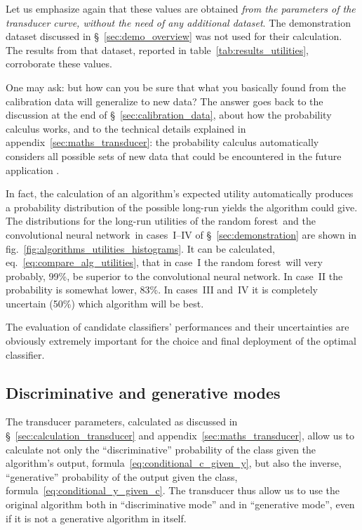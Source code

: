 \documentclass[\ifafour a4paper,12pt,\else a5paper,10pt,\fi%
onecolumn,oneside,article,%
british%
]{memoir}
\theoremstyle{remark}
\theoremstyle{innote}
\renewcommand*{\|}[1][]{\nonscript\:#1\vert\nonscript\:\mathopen{}}
\newcommand*{\sect}{\S}%
\newcommand*{\eqn}{eq.}%
\newcommand*{\fig}{fig.}%
\newcommand*{\cf}{{cf.}}
\newcommand*{\RF}{random forest}
\newcommand*{\CNN}{convolutional neural network}
\begin{document}
Let us emphasize again that these values are obtained \emph{from the parameters of the transducer curve, without the need of any additional dataset}. The demonstration dataset discussed in \sect~\ref{sec:demo_overview} was not used for their calculation. The results from that dataset, reported in table~\ref{tab:results_utilities}, corroborate these values.


One may ask: but how can you be sure that what you basically found from the calibration data will generalize to new data? The answer goes back to the discussion at the end of \sect~\ref{sec:calibration_data}, about how the probability calculus works, and to the technical details explained in appendix~\ref{sec:maths_transducer}: the probability calculus automatically considers all possible sets of new data that could be encountered in the future application \autocites[\cf][]{smithetal2006}.

In fact, the calculation of an algorithm's expected utility automatically produces a probability distribution of the possible long-run yields the algorithm could give. The distributions for the long-run utilities of the \RF\ and the \CNN\ in cases~I--IV of \sect~\ref{sec:demonstration} are shown in \fig~\ref{fig:algorithms_utilities_histograms}. It can be calculated, \eqn~\eqref{eq:compare_alg_utilities}, that in case~I the \RF\ will very probably, 99\%, be superior to the \CNN. In case~II the probability is somewhat lower, 83\%. In cases~III and~IV it is completely uncertain (50\%) which algorithm will be best.

The evaluation of candidate classifiers' performances and their uncertainties are obviously extremely important for the choice and final deployment of the optimal classifier.

\subsection{Discriminative and generative modes}
\label{sec:effect_transd}

The transducer parameters, calculated as discussed in \sect~\ref{sec:calculation_transducer} and appendix~\ref{sec:maths_transducer}, allow us to calculate not only the \enquote{discriminative} probability of the class given the algorithm's output, formula~\eqref{eq:conditional_c_given_y}, but also the inverse, \enquote{generative} probability \autocites[\sect~21.2.3]{russelletal1995_r2022}[\sect~8.6]{murphy2012} of the output given the class, formula~\eqref{eq:conditional_y_given_c}. The transducer thus allow us to use the original algorithm both in \enquote{discriminative mode} and in \enquote{generative mode}, even if it is not a generative algorithm in itself.
\end{document}
